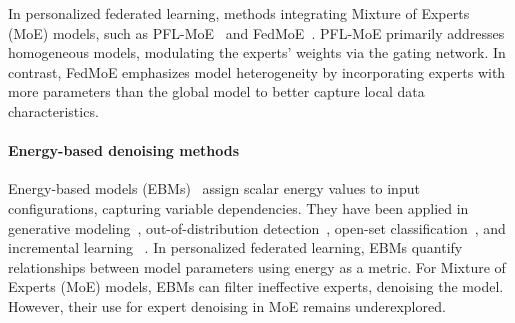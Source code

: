 In personalized federated learning, methods integrating Mixture of Experts~\cite{DBLP:journals/neco/JacobsJNH91, DBLP:conf/nips/ZhouLLDHZDCLL22} (MoE) models, such as PFL-MoE~\cite{DBLP:conf/apweb/GuoMXW21} and FedMoE~\cite{yi2024fedmoe}. PFL-MoE primarily addresses homogeneous models, modulating the experts' weights via the gating network. In contrast, FedMoE emphasizes model heterogeneity by incorporating experts with more parameters than the global model to better capture local data characteristics. 


\paragraph{Energy-based denoising methods}



Energy-based models (EBMs)~\cite{lecun2006tutorial} assign scalar energy values to input configurations, capturing variable dependencies. They have been applied in generative modeling~\cite{DBLP:conf/nips/DuM19}, out-of-distribution detection~\cite{DBLP:conf/nips/LiuWOL20,fan2022episodic}, open-set classification~\cite{al2022energy}, and incremental learning ~\cite{DBLP:conf/aaai/WangMHWSH23}. In personalized federated learning, EBMs quantify relationships between model parameters using energy as a metric. For Mixture of Experts (MoE) models, EBMs can filter ineffective experts, denoising the model. However, their use for expert denoising in MoE remains underexplored.